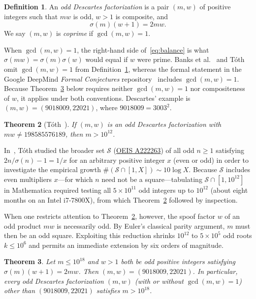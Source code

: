 \documentclass[11pt]{amsart}
\newtheorem{theorem}{Theorem}
\theoremstyle{definition}
\newtheorem{definition}[theorem]{Definition}
\theoremstyle{remark}
\begin{document}
\begin{definition}\label{def:descartes}
An \emph{odd Descartes factorization} is a pair $(m, w)$ of positive integers such that $mw$ is odd, $w > 1$ is composite, and
\begin{equation}\label{eq:balance}
  \sigma(m)(w + 1) = 2mw.
\end{equation}
We say $(m, w)$ is \emph{coprime} if $\gcd(m, w) = 1$.
\end{definition}

When $\gcd(m, w) = 1$, the right-hand side of~\eqref{eq:balance} is what $\sigma(mw) = \sigma(m)\sigma(w)$ would equal if $w$ were prime. Banks et al.~\cite{BGNS2008} and T\'oth~\cite{Toth2021} omit $\gcd(m, w) = 1$ from Definition~\ref{def:descartes}, whereas the formal statement in the Google DeepMind \emph{Formal Conjectures} repository~\cite{FormalConjectures} includes $\gcd(m, w) = 1$. Because Theorem~\ref{thm:main} below requires neither $\gcd(m, w) = 1$ nor compositeness of $w$, it applies under both conventions. Descartes' example is $(m, w) = (9018009, 22021)$, where $9018009 = 3003^2$.

\begin{theorem}[{T\'oth~\cite[Thm.~1]{Toth2021}}]\label{thm:toth}
If $(m, w)$ is an odd Descartes factorization with $mw \ne 198585576189$, then $m > 10^{12}$.
\end{theorem}

In~\cite{Toth2021}, T\'oth studied the broader set $\mathcal{S}$ (\href{https://oeis.org/A222263}{OEIS A222263}) of all odd $n \ge 1$ satisfying $2n/\sigma(n) - 1 = 1/x$ for an arbitrary positive integer $x$ (even or odd) in order to investigate the empirical growth $\#(\mathcal{S} \cap [1, X]) \sim 10 \log X$. Because $\mathcal{S}$ includes even multipliers $x$---for which $n$ need not be a square---tabulating $\mathcal{S} \cap [1, 10^{12}]$ in Mathematica required testing all $5 \times 10^{11}$ odd integers up to $10^{12}$ (about eight months on an Intel i7-7800X), from which Theorem~\ref{thm:toth} followed by inspection.

When one restricts attention to Theorem~\ref{thm:toth}, however, the spoof factor $w$ of an odd product $mw$ is necessarily odd. By Euler's classical parity argument, $m$ must then be an odd square. Exploiting this reduction shrinks $10^{12}$ to $5 \times 10^5$ odd roots $k \le 10^6$ and permits an immediate extension by six orders of magnitude.

\begin{theorem}\label{thm:main}
Let $m \le 10^{18}$ and $w > 1$ both be odd positive integers satisfying $\sigma(m)(w + 1) = 2mw$. Then $(m, w) = (9018009, 22021)$. In particular, every odd Descartes factorization $(m, w)$ (with or without $\gcd(m, w) = 1$) other than $(9018009, 22021)$ satisfies $m > 10^{18}$.
\end{theorem}
\end{document}
